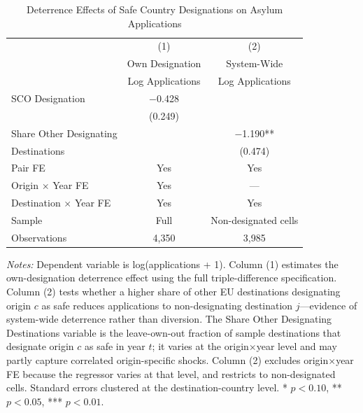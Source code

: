 \begin{table}[H]
\centering
\caption{Deterrence Effects of Safe Country Designations on Asylum Applications}
\begin{threeparttable}
\begin{tabular}{lcc}
\toprule
 & (1) & (2) \\
 & Own Designation & System-Wide \\
 & Log Applications & Log Applications \\
\midrule
SCO Designation & $-$0.428 & \\
 & (0.249) & \\[0.5em]
Share Other Designating & & $-$1.190** \\
\quad Destinations & & (0.474) \\[0.5em]
\midrule
Pair FE & Yes & Yes \\
Origin $\times$ Year FE & Yes & --- \\
Destination $\times$ Year FE & Yes & Yes \\
Sample & Full & Non-designated cells \\[0.3em]
Observations & 4,350 & 3,985 \\
\bottomrule
\end{tabular}
\begin{tablenotes}[flushleft]
\small
\item \textit{Notes:} Dependent variable is log(applications + 1). Column (1) estimates the own-designation deterrence effect using the full triple-difference specification. Column (2) tests whether a higher share of other EU destinations designating origin $c$ as safe reduces applications to non-designating destination $j$---evidence of system-wide deterrence rather than diversion. The Share Other Designating Destinations variable is the leave-own-out fraction of sample destinations that designate origin $c$ as safe in year $t$; it varies at the origin$\times$year level and may partly capture correlated origin-specific shocks. Column (2) excludes origin$\times$year FE because the regressor varies at that level, and restricts to non-designated cells. Standard errors clustered at the destination-country level. * $p<0.10$, ** $p<0.05$, *** $p<0.01$.
\end{tablenotes}
\end{threeparttable}
\label{tab:channels}
\end{table}
